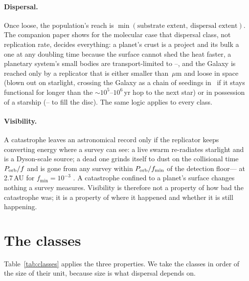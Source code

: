 \documentclass[11pt]{article}
\newcommand{\um}{\ensuremath{\,\mu\mathrm{m}}\xspace}
\begin{document}
\paragraph{Dispersal.}  Once loose, the population's reach is
$\min(\text{substrate extent},\ \text{dispersal extent})$.  The companion paper
shows for the molecular case that dispersal class, not replication rate,
decides everything: a planet's crust is a \CrustGovTime project and its bulk a
\BulkGovTime one at any doubling time because the surface cannot shed the
heat faster, a planetary system's small bodies are transport-limited to
\BeltConvTime--\KuiperConvTime, and the Galaxy is reached only by a
replicator that is either smaller than \BlowoutRadiusUm\um and loose in space
(blown out on starlight, crossing the Galaxy as a chain of seedings in
\SurvGrainTGalInf\ if it stays functional for longer than the $\sim10^{5}$--$10^{6}$\,yr
hop to the next star) or in possession of a starship (\FillFastFast--%
\FillSlowSlow to fill the disc).  The same logic applies to every class.

\paragraph{Visibility.}  A catastrophe leaves an astronomical record only if
the replicator keeps converting energy where a survey can see: a live swarm
re-radiates starlight and is a Dyson-scale source; a dead one grinds itself
to dust on the collisional time $P_{\rm orb}/f$ and is gone from any survey
within $P_{\rm orb}/f_{\min}$ of the detection floor---\MaxVisibleResidueMilli
at 2.7\,AU for $f_{\min}=10^{-3}$ \citep{Lacki2025,GooPaper}.  A catastrophe
confined to a planet's surface changes nothing a survey measures.  Visibility
is therefore not a property of how bad the catastrophe was; it is a property
of where it happened and whether it is still happening.

\section{The classes}

Table~\ref{tab:classes} applies the three properties.  We take the classes in
order of the size of their unit, because size is what dispersal depends on.
\end{document}
